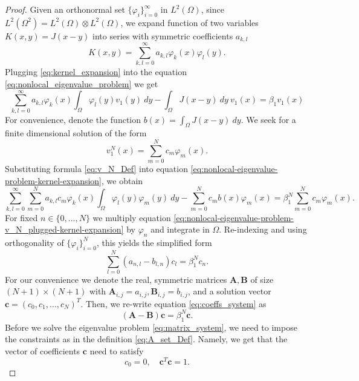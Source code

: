 \documentclass[11pt, a4paper]{article}
\theoremstyle{break}
\theoremstyle{break}
\theoremstyle{break}
\theoremstyle{break}
\theoremstyle{break}
\theoremstyle{break}
\theoremstyle{break}
\theoremstyle{break}
\theoremstyle{break}
\begin{document}
\begin{proof}

    Given an orthonormal set $\{\varphi_i\}_{i=0}^\infty$ in $L^2(\Omega)$, since $L^2(\Omega^2) = L^2(\Omega) \otimes L^2(\Omega)$, we expand function of two variables $K(x,y) = J(x-y)$ into series with symmetric coefficients $a_{k,l}$
    \begin{equation}
        \label{eq:kernel_expansion}
        K(x,y) = \sum_{k,l = 0}^\infty a_{k, l} \varphi_k(x) \varphi_l(y).
    \end{equation}
    Plugging \eqref{eq:kernel_expansion} into the equation \eqref{eq:nonlocal_eigenvalue_problem} we get
    \begin{equation}
        \label{eq:nonlocal-eigenvalue-problem-kernel-expansion}
        \sum_{k, l = 0}^\infty a_{k, l} \varphi_k(x)\int_\Omega \varphi_l(y) v_1(y)\:dy - \int_\Omega J(x-y)\:dy\: v_1(x) = \beta_1 v_1(x)
    \end{equation}
    For convenience, denote the function $b(x) = \int_\Omega J(x-y)\:dy$. We seek for a finite dimensional solution of the form
    \begin{equation}
        \label{eq:v_N_Def}
        v_1^N(x) = \sum_{m=0}^N c_m \varphi_m(x).
    \end{equation}
    Substituting formula \eqref{eq:v_N_Def} into equation \eqref{eq:nonlocal-eigenvalue-problem-kernel-expansion}, we obtain
    \begin{equation}
        \label{eq:nonlocal-eigenvalue-problem-v_N_plugged-kernel-expansion}
        \sum_{k, l = 0}^\infty \sum_{m=0}^N a_{k, l} c_m \varphi_k(x)\int_\Omega \varphi_l(y) \varphi_m(y)\:dy - \sum_{m=0}^N c_m b(x) \varphi_m(x) = \beta_1^N \sum_{m=0}^N c_m \varphi_m(x).
    \end{equation}
    For fixed $n \in \{0, \ldots, N\}$ we multiply equation \eqref{eq:nonlocal-eigenvalue-problem-v_N_plugged-kernel-expansion} by $\varphi_n$ and integrate in $\Omega$. Re-indexing and using orthogonality of $\{\varphi_i\}_{i=0}^N$, this yields the simplified form
    \begin{equation}
        \label{eq:coeffs_system}
        \sum_{l=0}^N(a_{n, l} - b_{l,n}) c_l = \beta_1^N c_n.
    \end{equation}
    For our convenience we denote the real, symmetric matrices $\mathbf{A}, \mathbf{B}$ of size $(N+1) \times (N+1)$ with $\mathbf{A}_{i,j} = a_{i,j}, \mathbf{B}_{i, j} = b_{i,j}$, and a solution vector $\mathbf{c} = (c_0, c_1, \ldots, c_N)^T$. Then, we re-write equation \eqref{eq:coeffs_system} as
    \begin{equation}
        \label{eq:matrix_system}
        (\mathbf{A} - \mathbf{B}) \mathbf{c} = \beta_1^N \mathbf{c}.
    \end{equation}
    Before we solve the eigenvalue problem \eqref{eq:matrix_system}, we need to impose the constraints as in the definition \eqref{eq:A_set_Def}. Namely, we get that the vector of coefficients $\mathbf{c}$ need to satisfy
    \begin{equation}
        \label{eq:matrix_system_constraint}
        c_0 = 0, \quad \mathbf{c}^T \mathbf{c} = 1.
    \end{equation}
    

\end{proof}
\end{document}
